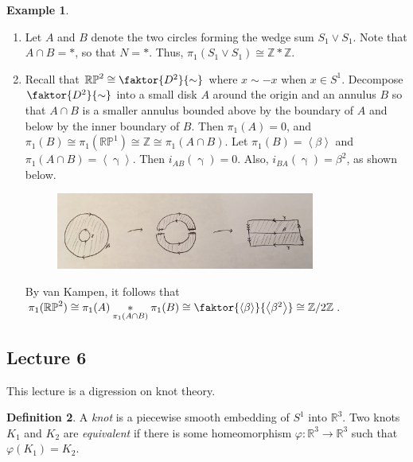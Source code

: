 \documentclass[10pt,letterpaper,cm]{nupset}
\theoremstyle{definition}
\newtheorem{definition}{Definition}[subsection]
\newtheorem{exmp}[definition]{Example}
\theoremstyle{theorem}
\theoremstyle{remark}
\newcommand{\R}{\mathbb{R}}
\newcommand{\RP}{\mathbb{RP}}
\newcommand{\Z}{\mathbb Z}
\newcommand{\1}{\mathbb{1}}
\newcommand{\0}{\vec 0}
\begin{document}
\begin{exmp} $ $
\begin{enumerate}
\item  Let $A$ and $B$ denote the two circles forming the wedge sum $S_1 \vee S_1$.  Note that $A\cap B = \ast$, so that $N=\ast$. Thus, $\pi_1(S_1 \vee S_1) \cong \Z \ast \Z$.
\item Recall that $\RP^2 \cong \faktor{D^2}{\sim}$ where $x\sim -x$ when $x\in S^1$. Decompose $\faktor{D^2}{\sim}$ into a small disk $A$ around the origin and an annulus $B$ so that $A \cap B$ is a smaller annulus bounded above by the boundary of $A$ and below by the inner boundary of $B$. Then $\pi_1(A) =0$, and $\pi_1(B) \cong \pi_1(\RP^1) \cong  \Z \cong \pi_1(A \cap B)$. Let $\pi_1(B) = \left\langle \beta \right\rangle$ and $\pi_1(A \cap B) = \left\langle \upgamma \right\rangle$. Then $i_{AB}(\upgamma) =0$. Also, $i_{BA}(\upgamma) = \beta^2$, as shown below.
\begin{figure}[H]
\centering
\includegraphics[width=85mm]{RP2.jpg}
\end{figure}
By van Kampen, it follows that $\pi_1(\RP^2) \cong \pi_1(A) \underset{\pi_1(A \cap B)}{\ast} \pi_1(B) \cong \faktor{\left\langle \beta \right\rangle}{\left\langle \beta^2 \right\rangle} \cong \Z / 2 \Z$.
\end{enumerate}
\end{exmp}



\subsection{Lecture 6}

This lecture is a digression on knot theory.

\begin{definition}
A \textit{knot} is a piecewise smooth embedding of $S^1$ into $\R^3$. Two knots $K_1$ and $K_2$ are \textit{equivalent} if there is some homeomorphism $\varphi : \R^3 \to \R^3$ such that $\varphi(K_1) = K_2$.
\end{definition}
\end{document}
